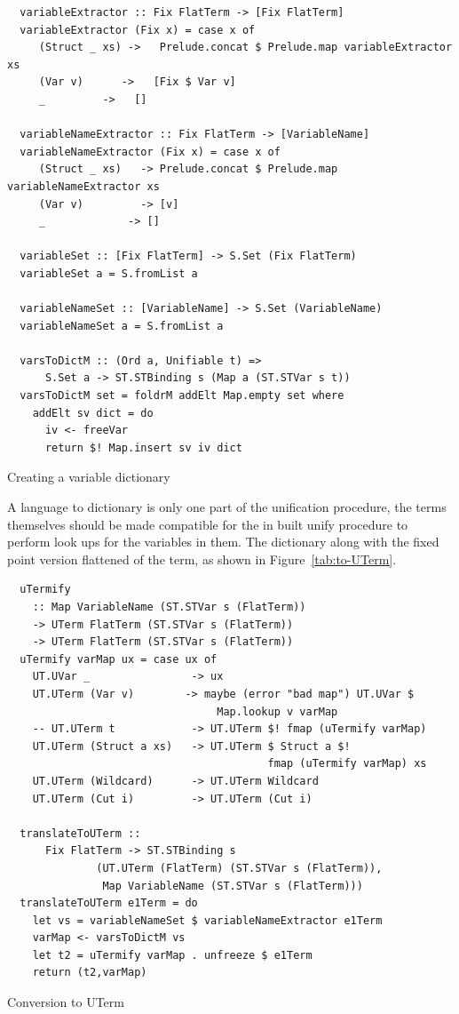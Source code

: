 \documentclass[thesis-solanki.tex]{subfiles}
\begin{document}
\begin{code-list}
  \begin{verbatim}
  variableExtractor :: Fix FlatTerm -> [Fix FlatTerm]
  variableExtractor (Fix x) = case x of
     (Struct _ xs) ->   Prelude.concat $ Prelude.map variableExtractor xs
     (Var v)      ->   [Fix $ Var v]
     _         ->   []

  variableNameExtractor :: Fix FlatTerm -> [VariableName]
  variableNameExtractor (Fix x) = case x of
     (Struct _ xs)   -> Prelude.concat $ Prelude.map variableNameExtractor xs
     (Var v)         -> [v]
     _             -> []

  variableSet :: [Fix FlatTerm] -> S.Set (Fix FlatTerm)
  variableSet a = S.fromList a

  variableNameSet :: [VariableName] -> S.Set (VariableName)
  variableNameSet a = S.fromList a

  varsToDictM :: (Ord a, Unifiable t) =>
      S.Set a -> ST.STBinding s (Map a (ST.STVar s t))
  varsToDictM set = foldrM addElt Map.empty set where
    addElt sv dict = do
      iv <- freeVar
      return $! Map.insert sv iv dict
  \end{verbatim}
  \vspace*{-1.0\baselineskip}
  \caption{Creating a variable dictionary}
  \label{tab:varsToDictM}
\end{code-list}
A language to  dictionary is only one part of the unification procedure, the terms themselves should be made
compatible for the in built unify procedure to perform look ups for the variables in them.
The dictionary along with the fixed point version flattened of the term, as shown in Figure~\ref{tab:to-UTerm}.
%
\begin{code-list}
  \begin{verbatim}
  uTermify
    :: Map VariableName (ST.STVar s (FlatTerm))
    -> UTerm FlatTerm (ST.STVar s (FlatTerm))
    -> UTerm FlatTerm (ST.STVar s (FlatTerm))
  uTermify varMap ux = case ux of
    UT.UVar _                -> ux
    UT.UTerm (Var v)        -> maybe (error "bad map") UT.UVar $
                                 Map.lookup v varMap
    -- UT.UTerm t            -> UT.UTerm $! fmap (uTermify varMap)
    UT.UTerm (Struct a xs)   -> UT.UTerm $ Struct a $!
                                         fmap (uTermify varMap) xs
    UT.UTerm (Wildcard)      -> UT.UTerm Wildcard
    UT.UTerm (Cut i)         -> UT.UTerm (Cut i)

  translateToUTerm ::
      Fix FlatTerm -> ST.STBinding s
              (UT.UTerm (FlatTerm) (ST.STVar s (FlatTerm)),
               Map VariableName (ST.STVar s (FlatTerm)))
  translateToUTerm e1Term = do
    let vs = variableNameSet $ variableNameExtractor e1Term
    varMap <- varsToDictM vs
    let t2 = uTermify varMap . unfreeze $ e1Term
    return (t2,varMap)
  \end{verbatim}
  \caption{Conversion to UTerm}
  \label{tab:to-UTerm}
\end{code-list}
\end{document}
